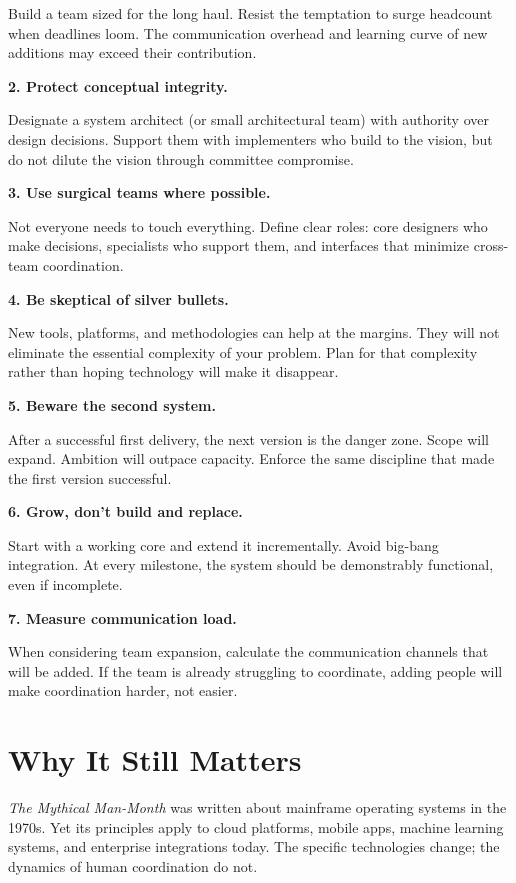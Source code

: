 \documentclass[11pt, letterpaper]{article}
\begin{document}
Build a team sized for the long haul. Resist the temptation to surge headcount when deadlines loom. The communication overhead and learning curve of new additions may exceed their contribution.

\textbf{2. Protect conceptual integrity.}

Designate a system architect (or small architectural team) with authority over design decisions. Support them with implementers who build to the vision, but do not dilute the vision through committee compromise.

\textbf{3. Use surgical teams where possible.}

Not everyone needs to touch everything. Define clear roles: core designers who make decisions, specialists who support them, and interfaces that minimize cross-team coordination.

\textbf{4. Be skeptical of silver bullets.}

New tools, platforms, and methodologies can help at the margins. They will not eliminate the essential complexity of your problem. Plan for that complexity rather than hoping technology will make it disappear.

\textbf{5. Beware the second system.}

After a successful first delivery, the next version is the danger zone. Scope will expand. Ambition will outpace capacity. Enforce the same discipline that made the first version successful.

\textbf{6. Grow, don't build and replace.}

Start with a working core and extend it incrementally. Avoid big-bang integration. At every milestone, the system should be demonstrably functional, even if incomplete.

\textbf{7. Measure communication load.}

When considering team expansion, calculate the communication channels that will be added. If the team is already struggling to coordinate, adding people will make coordination harder, not easier.

\vspace{1em}

\section*{Why It Still Matters}

\textit{The Mythical Man-Month} was written about mainframe operating systems in the 1970s. Yet its principles apply to cloud platforms, mobile apps, machine learning systems, and enterprise integrations today. The specific technologies change; the dynamics of human coordination do not.
\end{document}
